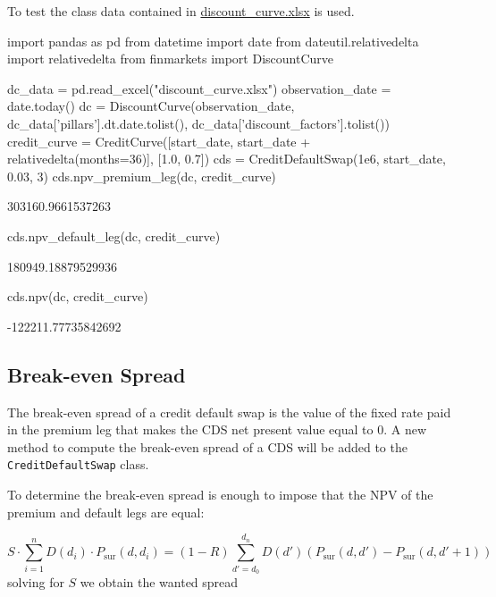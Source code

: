 To test the class data contained in \href{https://github.com/matteosan1/finance_course/blob/develop/libro/input_files/discount_curve.xlsx?raw=true}{discount\_curve.xlsx} is used.

\begin{ipython}
import pandas as pd
from datetime import date
from dateutil.relativedelta import relativedelta
from finmarkets import DiscountCurve

dc_data = pd.read_excel("discount_curve.xlsx")
observation_date = date.today() 
dc = DiscountCurve(observation_date,
dc_data['pillars'].dt.date.tolist(),
dc_data['discount_factors'].tolist())
credit_curve = CreditCurve([start_date,
                            start_date + relativedelta(months=36)],
                            [1.0, 0.7])
cds = CreditDefaultSwap(1e6, start_date, 0.03, 3)
cds.npv_premium_leg(dc, credit_curve)
\end{ipython}
\begin{ioutput}
303160.9661537263
\end{ioutput}

\begin{ipython}
cds.npv_default_leg(dc, credit_curve)
\end{ipython}
\begin{ioutput}
180949.18879529936
\end{ioutput}

\begin{ipython}
cds.npv(dc, credit_curve)
\end{ipython}
\begin{ioutput}
-122211.77735842692
\end{ioutput}
	
\subsection{Break-even Spread}
The break-even spread of a credit default swap is the value of the fixed rate paid in the premium leg that makes the CDS net present value equal to 0.
A new method to compute the break-even spread of a CDS will be added to the \texttt{CreditDefaultSwap} class.

To determine the break-even spread is enough to impose that the NPV of the premium and default legs are equal:

\begin{equation}
S \cdot\sum_{i=1}^{n} D(d_i) \cdot P_{\textrm{sur}}(d, d_i)
= (1-R) \sum_{d'=d_0}^{d_n} D(d') \left( P_{\textrm{sur}}(d, d') - P_{\textrm{sur}}(d, d'+1) \right)
\end{equation}
solving for $S$ we obtain the wanted spread

